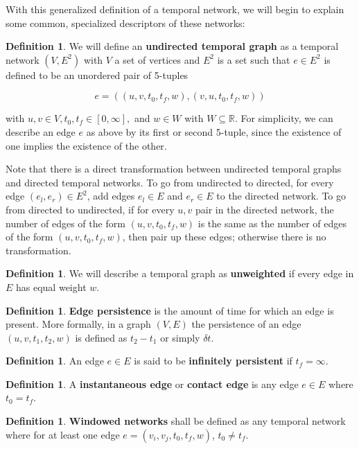\documentclass{article}
\theoremstyle{definition}
\newtheorem{defn}[thm]{Definition}
\numberwithin{thm}{subsection}
\begin{document}
With this generalized definition of a temporal network, we will begin to explain
some common, specialized descriptors of these networks:

\begin{defn}
  We will define an \textbf{undirected temporal graph} as a temporal network
  $(V,E^2)$ with $V$ a set of vertices and $E^2$ is a set such
  that $e \in E^2$ is defined to be an unordered pair of 5-tuples

    \[e = \left((u,v,t_0, t_f, w), (v,u,t_0,t_f, w)\right)\]

  with $u,v \in V, t_0, t_f \in [0, \infty],$ and $w \in W$ with
  $W \subseteq \mathbb{R}$. For simplicity, we can describe an edge $e$ as above
  by its first or second 5-tuple, since the existence of one implies the
  existence of the other.
\end{defn}

Note that there is a direct transformation between undirected temporal graphs and
directed temporal networks. To go from undirected to directed, for every edge
$(e_l,e_r) \in E^2$, add edges $e_l \in E$ and $e_r \in E$ to the directed
network. To go from directed to undirected, if for every $u,v$ pair in the
directed network, the number of edges of the form $(u,v,t_0,t_f,w)$ is the same
as the number of edges of the form $(u,v,t_0,t_f,w)$, then pair up these edges;
otherwise there is no transformation.

\begin{defn}
  We will describe a temporal graph as \textbf{unweighted} if every edge in $E$
  has equal weight $w$.
\end{defn}

\begin{defn}
  \textbf{Edge persistence} is the amount of time for which an edge is present.
  More formally, in a graph $(V,E)$ the persistence of an edge $(u,v,t_1,t_2,
  w)$ is defined as $t_2 - t_1$ or simply $\delta t$.
\end{defn}

\begin{defn}
  An edge $e \in E$ is said to be \textbf{infinitely persistent}
  if $t_f = \infty$.
\end{defn}

\begin{defn}
  A \textbf{instantaneous edge} or \textbf{contact edge} is any edge $e \in E$
  where $t_0 = t_f$.
\end{defn}

\begin{defn}
  \textbf{Windowed networks} shall be defined as
  any temporal network where for at least one edge $e = (v_i, v_j, t_0, t_f,w)$,
  $t_0 \neq t_f$.
\end{defn}
\end{document}
